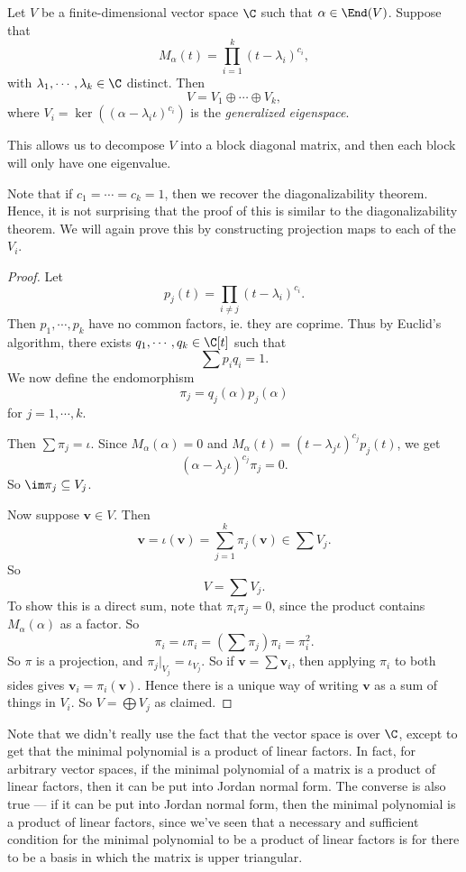 \documentclass[a4paper]{article}
\begin{document}
\begin{thm}
  Let $V$ be a finite-dimensional vector space $\C$ such that $\alpha \in \End(V)$. Suppose that
  \[
    M_\alpha(t) = \prod_{i = 1}^k (t - \lambda_i)^{c_i},
  \]
  with $\lambda_1, \cdots, \lambda_k \in \C$ distinct. Then
  \[
    V = V_1 \oplus \cdots \oplus V_k,
  \]
  where $V_i = \ker((\alpha - \lambda_i \iota)^{c_i})$ is the \emph{generalized eigenspace}.
\end{thm}
This allows us to decompose $V$ into a block diagonal matrix, and then each block will only have one eigenvalue.

Note that if $c_1 = \cdots = c_k = 1$, then we recover the diagonalizability theorem. Hence, it is not surprising that the proof of this is similar to the diagonalizability theorem. We will again prove this by constructing projection maps to each of the $V_i$.

\begin{proof}
  Let
  \[
    p_j(t) = \prod_{i \not= j} (t - \lambda_i)^{c_i}.
  \]
  Then $p_1, \cdots, p_k$ have no common factors, ie. they are coprime. Thus by Euclid's algorithm, there exists $q_1, \cdots, q_k \in \C[t]$ such that
  \[
    \sum p_i q_i = 1.
  \]
  We now define the endomorphism
  \[
    \pi_j = q_j(\alpha) p_j(\alpha)
  \]
  for $j = 1, \cdots, k$.

  Then $\sum \pi_j = \iota$. Since $M_\alpha(\alpha) = 0$ and $M_\alpha(t) = (t - \lambda_j \iota)^{c_j} p_j(t)$, we get
  \[
    (\alpha - \lambda_j \iota)^{c_j} \pi_j = 0.
  \]
  So $\im \pi_j \subseteq V_j$.

  Now suppose $\mathbf{v} \in V$. Then
  \[
    \mathbf{v} = \iota (\mathbf{v}) = \sum_{j = 1}^k \pi_j (\mathbf{v}) \in \sum V_j.
  \]
  So
  \[
    V = \sum V_j.
  \]
  To show this is a direct sum, note that $\pi_i \pi_j = 0$, since the product contains $M_\alpha(\alpha)$ as a factor. So
  \[
    \pi_i = \iota \pi_i = \left(\sum \pi_j\right) \pi_i = \pi_i^2.
  \]
  So $\pi$ is a projection, and $\pi_j|_{V_j} = \iota_{V_j}$. So if $\mathbf{v} = \sum \mathbf{v}_i$, then applying $\pi_i$ to both sides gives $\mathbf{v}_i = \pi_i (\mathbf{v})$. Hence there is a unique way of writing $\mathbf{v}$ as a sum of things in $V_i$. So $V = \bigoplus V_j$ as claimed.
\end{proof}
Note that we didn't really use the fact that the vector space is over $\C$, except to get that the minimal polynomial is a product of linear factors. In fact, for arbitrary vector spaces, if the minimal polynomial of a matrix is a product of linear factors, then it can be put into Jordan normal form. The converse is also true --- if it can be put into Jordan normal form, then the minimal polynomial is a product of linear factors, since we've seen that a necessary and sufficient condition for the minimal polynomial to be a product of linear factors is for there to be a basis in which the matrix is upper triangular.
\end{document}
